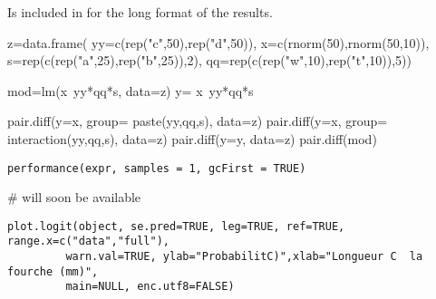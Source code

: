 \documentclass[a4paper]{book}
\begin{document}
%
\begin{SeeAlso}\relax
Is included in  for the long format of the results.
\end{SeeAlso}
%
\begin{Examples}
\begin{ExampleCode}

z=data.frame( yy=c(rep("c",50),rep("d",50)),
              x=c(rnorm(50),rnorm(50,10)),
              s=rep(c(rep("a",25),rep("b",25)),2),
              qq=rep(c(rep("w",10),rep("t",10)),5))

mod=lm(x~yy*qq*s, data=z)
y= x~yy*qq*s

pair.diff(y=x, group= paste(yy,qq,s), data=z)
pair.diff(y=x, group= interaction(yy,qq,s), data=z)
pair.diff(y=y, data=z)
pair.diff(mod)
\end{ExampleCode}
\end{Examples}
\newpage
{}
%
\begin{Usage}
\begin{verbatim}
performance(expr, samples = 1, gcFirst = TRUE)
\end{verbatim}
\end{Usage}
%
\begin{Arguments}
\begin{ldescription}
\item[\code{expr}] 


\item[\code{samples}] 


\item[\code{gcFirst}] 


\end{ldescription}
\end{Arguments}
%
\begin{Examples}
\begin{ExampleCode}
# will soon be available
\end{ExampleCode}
\end{Examples}
\newpage
{}
%
\begin{Usage}
\begin{verbatim}
plot.logit(object, se.pred=TRUE, leg=TRUE, ref=TRUE, range.x=c("data","full"), 
         warn.val=TRUE, ylab="ProbabilitC)",xlab="Longueur C  la fourche (mm)",
         main=NULL, enc.utf8=FALSE)
\end{verbatim}
\end{Usage}
%
\end{document}
